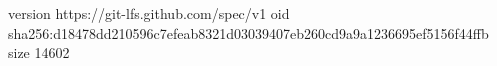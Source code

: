 version https://git-lfs.github.com/spec/v1
oid sha256:d18478dd210596c7efeab8321d03039407eb260cd9a9a1236695ef5156f44ffb
size 14602
